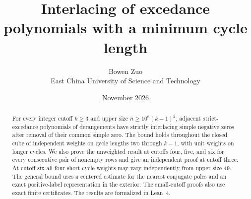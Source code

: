 \documentclass[11pt]{article}
\title{Interlacing of excedance polynomials with a minimum cycle length}
\author{Bowen Zuo\\[2pt]\small East China University of Science and Technology}
\date{November 2026}
\begin{document}
\maketitle
\begin{abstract}
For every integer cutoff \(k\ge3\) and upper size \(n\ge10^6(k-1)^2\), adjacent strict-excedance polynomials of derangements have strictly interlacing simple negative zeros after removal of their common simple zero. The bound holds throughout the closed cube of independent weights on cycle lengths two through \(k-1\), with unit weights on longer cycles. We also prove the unweighted result at cutoffs four, five, and six for every consecutive pair of nonempty rows and give an independent proof at cutoff three. At cutoff six all four short-cycle weights may vary independently from upper size 49. The general bound uses a centered estimate for the nearest conjugate poles and an exact positive-label representation in the exterior. The small-cutoff proofs also use exact finite certificates. The results are formalized in Lean~4.
\end{abstract}
\end{document}
